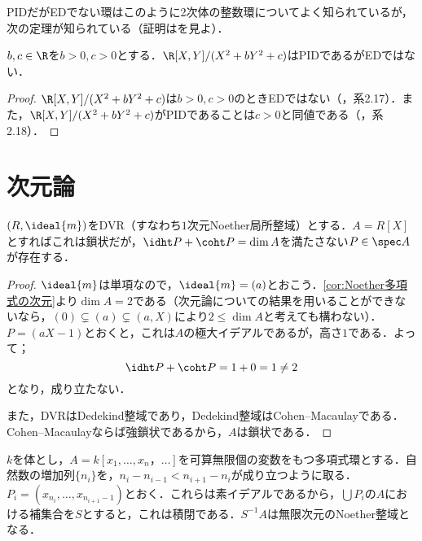 PIDだがEDでない環はこのように2次体の整数環についてよく知られているが，次の定理が知られている（証明は\cite{goel2018nullstellenstze}を見よ）．

\begin{thm}
	$b,c\in\R$を$b>0,c>0$とする．$\R[X,Y]/(X^2+bY^2+c)$はPIDであるがEDではない．
\end{thm}

\begin{proof}
	$\R[X,Y]/(X^2+bY^2+c)$は$b>0,c>0$のときEDではない（\cite{goel2018nullstellenstze}，系2.17）．また，$\R[X,Y]/(X^2+bY^2+c)$がPIDであることは$c>0$と同値である（\cite{goel2018nullstellenstze}，系2.18）．
\end{proof}

\section{次元論}
\begin{surex}[鎖状だが$\idht P+\coht P=\dim A$が成りたたない例]\label{ex:鎖状だがht P+coht P<dim P}
	$(R,\ideal{m})$をDVR（すなわち$1$次元Noether局所整域）とする．$A=R[X]$とすればこれは鎖状だが，$\idht P+\coht P=\dim A$を満たさない$P\in\spec A$が存在する．
\end{surex}

\begin{proof}
	$\ideal{m}$は単項なので，$\ideal{m}=(a)$とおこう．\ref{cor:Noether多項式の次元}より$\dim A=2$である（次元論についての結果を用いることができないなら，$(0)\subsetneq (a)\subsetneq (a,X)$により$2\leq\dim A$と考えても構わない）．$P=(aX-1)$とおくと，これは$A$の極大イデアルであるが，高さ$1$である．よって；
	\[\idht P+\coht P=1+0=1\neq 2\]
	となり，成り立たない．
	
	また，DVRはDedekind整域であり，Dedekind整域はCohen--Macaulayである．Cohen--Macaulayならば強鎖状であるから，$A$は鎖状である．
\end{proof}
\begin{surex}\label{ex:無限次元Noether環}
	$k$を体とし，$A=k[x_1,\dots,x_n，\dots]$を可算無限個の変数をもつ多項式環とする．自然数の増加列$\{n_i\}$を，$n_i-n_{i-1}<n_{i+1}-n_i$が成り立つように取る．$P_i=(x_{n_i},\dots,x_{n_{i+1}-1})$とおく．これらは素イデアルであるから，$\bigcup P_i$の$A$における補集合を$S$とすると，これは積閉である．$S^{-1}A$は無限次元のNoether整域となる．
\end{surex}

